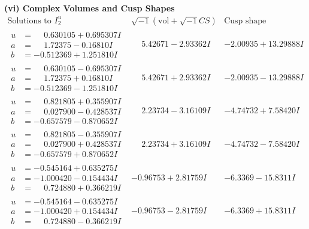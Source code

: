 \documentclass[1p]{elsarticle_modified}
\theoremstyle{definition}
\newcommand{\I}{\sqrt{-1}}
\begin{document}
\newpage\flushleft \textbf{(vi) Complex Volumes and Cusp Shapes}
$$\begin{array}{c|c|c}  
\text{Solutions to }I^u_{2}& \I (\text{vol} + \sqrt{-1}CS) & \text{Cusp shape}\\
 \hline 
\begin{aligned}
u &= \phantom{-}0.630105 + 0.695307 I \\
a &= \phantom{-}1.72375 - 0.16810 I \\
b &= -0.512369 + 1.251810 I\end{aligned}
 & \phantom{-}5.42671 - 2.93362 I & -2.00935 + 13.29888 I \\ \hline\begin{aligned}
u &= \phantom{-}0.630105 - 0.695307 I \\
a &= \phantom{-}1.72375 + 0.16810 I \\
b &= -0.512369 - 1.251810 I\end{aligned}
 & \phantom{-}5.42671 + 2.93362 I & -2.00935 - 13.29888 I \\ \hline\begin{aligned}
u &= \phantom{-}0.821805 + 0.355907 I \\
a &= \phantom{-}0.027900 - 0.428537 I \\
b &= -0.657579 - 0.870652 I\end{aligned}
 & \phantom{-}2.23734 - 3.16109 I & -4.74732 + 7.58420 I \\ \hline\begin{aligned}
u &= \phantom{-}0.821805 - 0.355907 I \\
a &= \phantom{-}0.027900 + 0.428537 I \\
b &= -0.657579 + 0.870652 I\end{aligned}
 & \phantom{-}2.23734 + 3.16109 I & -4.74732 - 7.58420 I \\ \hline\begin{aligned}
u &= -0.545164 + 0.635275 I \\
a &= -1.000420 - 0.154434 I \\
b &= \phantom{-}0.724880 + 0.366219 I\end{aligned}
 & -0.96753 + 2.81759 I & -6.3369 - 15.8311 I \\ \hline\begin{aligned}
u &= -0.545164 - 0.635275 I \\
a &= -1.000420 + 0.154434 I \\
b &= \phantom{-}0.724880 - 0.366219 I\end{aligned}
 & -0.96753 - 2.81759 I & -6.3369 + 15.8311 I \\ \hline\begin{aligned}

\end{aligned}
\end{array}$$
\end{document}
